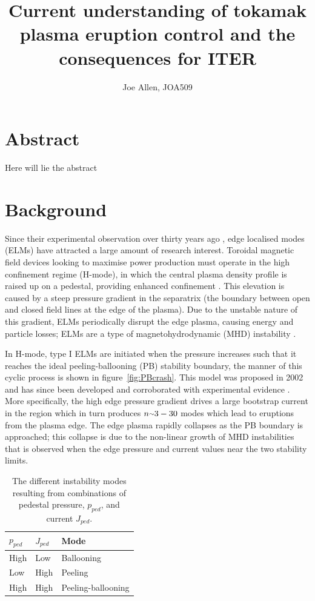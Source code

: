 \documentclass[12pt]{article}  %
\providecommand{\squiggle}{\raise.17ex\hbox{$\scriptstyle\sim$}} %
\begin{document}
\title{Current understanding of tokamak plasma eruption control and the consequences for ITER}
\author{Joe Allen, JOA509}
\maketitle

\section{Abstract}
Here will lie the abstract

\section{Background}\label{sec:Bg}
Since their experimental observation over thirty years ago \cite{Keilhacker1984}, edge localised modes (ELMs) have attracted a large amount of research interest. Toroidal magnetic field devices looking to maximise power production must operate in the high confinement regime (H-mode), in which the central plasma density profile is raised up on a pedestal, providing enhanced confinement \cite{Wagner2007}. This elevation is caused by a steep pressure gradient in the separatrix (the boundary between open and closed field lines at the edge of the plasma). Due to the unstable nature of this gradient, ELMs periodically disrupt the edge plasma, causing energy and particle losses; ELMs are a type of magnetohydrodynamic (MHD) instability \cite{Zohm1996}.

In H-mode, type I ELMs are initiated when the pressure increases such that it reaches the ideal peeling-ballooning (PB) stability boundary, the manner of this cyclic process is shown in figure~\ref{fig:PBcrash}. This model was proposed in 2002 \cite{Snyder2002} and has since been developed and corroborated with experimental evidence \cite{Wilson2002}. More specifically, the high edge pressure gradient drives a large bootstrap current in the region which in turn produces $n\squiggle 3-30$ modes \cite{Snyder2009} which lead to eruptions from the plasma edge. The edge plasma rapidly collapses as the PB boundary is approached; this collapse is due to the non-linear growth of MHD instabilities \cite{Wilson2004} that is observed when the edge pressure and current values near the two stability limits.


\begin{table}[h]
\centering
\caption{The different instability modes resulting from combinations of pedestal pressure, $p_{ped}$, and current $J_{ped}$.\cite{Lang2013}}
\label{tab:PB}
\begin{tabular}{lll}
\hline
\textbf{$p_{ped}$}   & \textbf{$J_{ped}$} & \textbf{Mode} \\ \hline
   High      &    Low     &  Ballooning \\
   Low       &    High    &  Peeling    \\
   High      &    High    &  Peeling-ballooning
\end{tabular}
\end{table}
\end{document}
